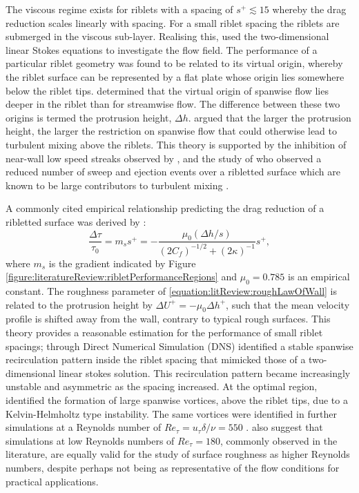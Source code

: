 \documentclass[12pt,oneside,a4paper]{article}
\begin{document}
%
The viscous regime exists for riblets with a spacing of $s^+  \lesssim 15$ whereby the drag reduction scales linearly with spacing. For a small riblet spacing the riblets are submerged in the viscous sub-layer. Realising this, \cite{luchini1991} used the two-dimensional linear Stokes equations to investigate the flow field. The performance of a particular riblet geometry was found to be related to its virtual origin, whereby the riblet surface can be represented by a flat plate whose origin lies somewhere below the riblet tips. \cite{luchini1991} determined that the virtual origin of spanwise flow lies deeper in the riblet than for streamwise flow. The difference between these two origins  is termed the protrusion height, $\Delta h$. \cite{luchini1991} argued that the larger the protrusion height, the larger the restriction on spanwise flow that could otherwise lead to turbulent mixing above the riblets. This theory is supported by the inhibition of near-wall low speed streaks observed by \cite{chu1993}, and the study of \cite{yang2016} who observed a reduced number of sweep and ejection events over a ribletted surface which are known to be large contributors to turbulent mixing \citep{pope2001}.

A commonly cited empirical relationship predicting the drag reduction of a ribletted surface was derived by \cite{bechert1997}:
\begin{equation}
\label{equation:literatureReview:ribletGradient}
\frac{\Delta \tau}{\tau_0} = m_s s^+ = - \frac{\mu_0 (\Delta h / s)}{(2 C_f)^{-1/2} + (2 \kappa)^{-1}}s^+,
\end{equation}
where $m_s$ is the gradient indicated by Figure \ref{figure:literatureReview:ribletPerformanceRegions} and $\mu_0 = 0.785$ is an empirical constant. The roughness parameter of 
\eqref{equation:litReview:roughLawOfWall} is related to the protrusion height by $\Delta U^+ = - \mu_0 \Delta h^+$, such that the mean velocity profile is shifted away from the wall, contrary to typical rough surfaces. This theory provides a reasonable estimation for the performance of small riblet spacings; through Direct Numerical Simulation (DNS) \cite{garcia2011a} identified a stable spanwise recirculation pattern inside the riblet spacing that mimicked those of a two-dimensional linear stokes solution. This recirculation pattern became increasingly unstable and asymmetric as the spacing increased. At the optimal region, \cite{garcia2011a} identified the formation of large spanwise vortices, above the riblet tips, due to a Kelvin-Helmholtz type instability. The same vortices were identified in further simulations at a Reynolds number of $Re_\tau = u_\tau \delta / \nu = 550$ \citep{garcia2012}. \cite{garcia2012} also suggest that simulations at low Reynolds numbers of $Re_\tau = 180$, commonly observed in the literature, are equally valid for the study of surface roughness as higher Reynolds numbers, despite perhaps not being as representative of the flow conditions for practical applications. 
\end{document}
